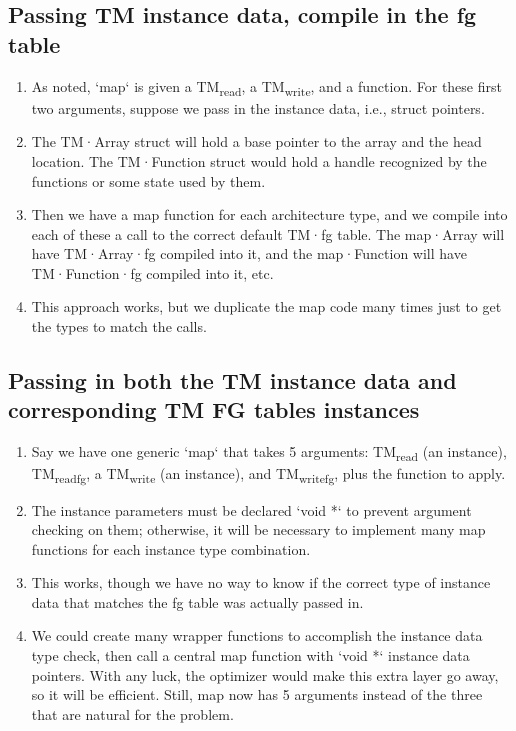 \documentclass[11pt]{article}
\begin{document}
\subsection{Passing TM instance data, compile in the fg table}
\label{sec:orged57256}

\begin{enumerate}
\item As noted, `map` is given a TM\textsubscript{read}, a TM\textsubscript{write}, and a function. For these first two
arguments, suppose we pass in the instance data, i.e., struct pointers.

\item The TM·Array struct will hold a base pointer to the array and the head location. The TM·Function struct would hold a handle recognized by the functions or some state used by them.

\item Then we have a map function for each architecture type, and we compile into each of these a call to the correct default TM·fg table. The map·Array will have TM·Array·fg compiled into it, and the map·Function will have TM·Function·fg compiled into it, etc.

\item This approach works, but we duplicate the map code many times just to get the types to match the calls.
\end{enumerate}


\subsection{Passing in both the TM instance data and corresponding TM FG tables instances}
\label{sec:orgf9f5316}

\begin{enumerate}
\item Say we have one generic `map` that takes 5 arguments: TM\textsubscript{read} (an instance), TM\textsubscript{read}\textsubscript{fg}, a TM\textsubscript{write} (an instance), and TM\textsubscript{write}\textsubscript{fg}, plus the function to apply.

\item The instance parameters must be declared `void *` to prevent argument checking on them; otherwise, it will be necessary to implement many map functions for each instance type combination.

\item This works, though we have no way to know if the correct type of instance data that matches the fg table was actually passed in.

\item We could create many wrapper functions to accomplish the instance data type check, then call a central map function with `void *` instance data pointers. With any luck, the optimizer would make this extra layer go away, so it will be efficient. Still, map now has 5 arguments instead of the three that are natural for the problem.
\end{enumerate}
\end{document}
